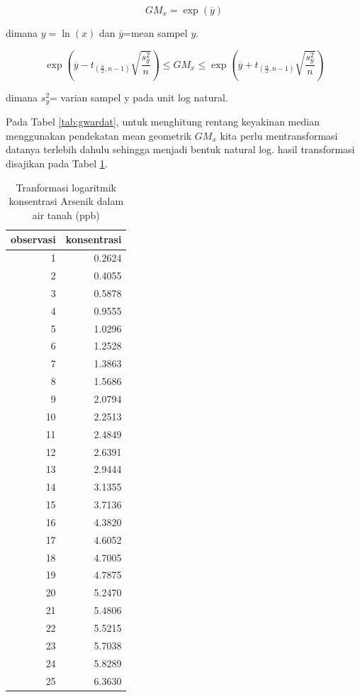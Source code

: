 \documentclass[]{book}
\begin{document}
\begin{equation}
  GM_x=\exp\left(\overline{y}\right) 
  \label{eq:gmci}
\end{equation}

dimana \(y=\ln(x)\) dan \(\overline{y}\)=mean sampel \(y\).

\begin{equation}
  \exp\left(\overline{y}-t_{\left(\frac{\alpha}{2},n-1\right)}\sqrt{\frac{s_y^2}{n}}\right)\le GM_x\le\exp\left(\overline{y}+t_{\left(\frac{\alpha}{2},n-1\right)}\sqrt{\frac{s_y^2}{n}}\right) 
  \label{eq:gmci2}
\end{equation}

dimana \(s_{y}^2\)= varian sampel y pada unit log natural.

Pada Tabel \ref{tab:gwardat}, untuk menghitung rentang keyakinan median
menggunakan pendekatan mean geometrik \(GM_x\) kita perlu
mentransformasi datanya terlebih dahulu sehingga menjadi bentuk natural
log. hasil transformasi disajikan pada Tabel \ref{tab:gwardat2}.

\begin{table}[t]

\caption{\label{tab:gwardat2}Tranformasi logaritmik konsentrasi Arsenik dalam air tanah (ppb)}
\centering
\begin{tabular}{r|r}
\hline
observasi & konsentrasi\\
\hline
1 & 0.2624\\
\hline
2 & 0.4055\\
\hline
3 & 0.5878\\
\hline
4 & 0.9555\\
\hline
5 & 1.0296\\
\hline
6 & 1.2528\\
\hline
7 & 1.3863\\
\hline
8 & 1.5686\\
\hline
9 & 2.0794\\
\hline
10 & 2.2513\\
\hline
11 & 2.4849\\
\hline
12 & 2.6391\\
\hline
13 & 2.9444\\
\hline
14 & 3.1355\\
\hline
15 & 3.7136\\
\hline
16 & 4.3820\\
\hline
17 & 4.6052\\
\hline
18 & 4.7005\\
\hline
19 & 4.7875\\
\hline
20 & 5.2470\\
\hline
21 & 5.4806\\
\hline
22 & 5.5215\\
\hline
23 & 5.7038\\
\hline
24 & 5.8289\\
\hline
25 & 6.3630\\
\hline
\end{tabular}
\end{table}
\end{document}
